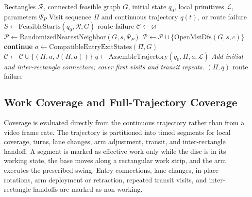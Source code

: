 \documentclass[a4paper,11pt]{article}
\providecommand{\DIFaddbegin}{} %
\begin{document}
\begin{algorithm}[htbp]
\caption{Global route planning and trajectory assembly}
\label{alg:global-route}
\small
\begin{algorithmic}[1]
\Require Rectangles $\mathcal R$, connected feasible graph $G$, initial state $q_0$, local primitives $\mathcal L$, parameters $\Psi_P$
\Ensure Visit sequence $\Pi$ and continuous trajectory $q(t)$, or route failure
\State $S\gets\mathrm{FeasibleStarts}(q_0,\mathcal R,G)$
  \State \Return route failure
\EndIf
\State $\mathcal C\gets\varnothing$
  \State $\mathcal P\gets\mathrm{RandomizedNearestNeighbor}(G,s,\Psi_P)$
  \State $\mathcal P\gets\mathcal P\cup\{\mathrm{OpenMstDfs}(G,s,c)\}$ 
      \State \textbf{continue}
    \EndIf
    \State $a\gets\mathrm{CompatibleEntryExitStates}(\Pi,G)$
      \State $\mathcal C\gets\mathcal C\cup\{(\Pi,a,J(\Pi,a))\}$ 
    \EndIf
  \EndFor
\EndFor
{}
  \State $q\gets\mathrm{AssembleTrajectory}(q_0,\Pi,a,\mathcal L)$
  \Statex \hspace{\algorithmicindent}\textit{Add initial and inter-rectangle connectors; cover first visits and transit repeats.}
    \State \Return $(\Pi,q)$
  \EndIf
\EndFor
\State \Return route failure
\end{algorithmic}
\end{algorithm}

\subsection{Work Coverage and Full-Trajectory Coverage}
\label{sec:coverage-evaluation}

Coverage is evaluated directly from the continuous trajectory rather than from a video frame rate. The trajectory is partitioned into timed segments for local coverage, turns, lane changes, arm adjustment, transit, and inter-rectangle handoff. A segment is marked as effective work only while the disc is in its working state, the base moves along a rectangular work strip, and the arm executes the prescribed swing. Entry connections, lane changes, in-place rotations, arm deployment or retraction, repeated transit visits, and inter-rectangle handoffs are marked as non-working.
\DIFaddbegin 
\end{document}
